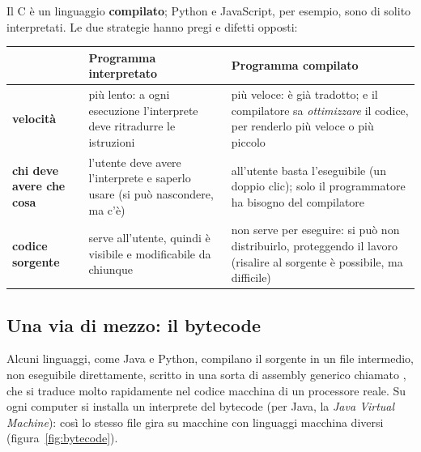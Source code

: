 Il C è un linguaggio \textbf{compilato}; Python e JavaScript, per esempio,
sono di solito interpretati. Le due strategie hanno pregi e difetti
opposti:

\begin{center}
\renewcommand{\arraystretch}{1.45}
\begin{tabular}{@{}>{\raggedright\arraybackslash}p{2.8cm}>{\raggedright\arraybackslash}p{6.6cm}>{\raggedright\arraybackslash}p{6.6cm}@{}}
  \toprule
  & \textbf{Programma interpretato} & \textbf{Programma compilato} \\
  \midrule
  \textbf{velocità} & più lento: a ogni esecuzione l'interprete deve ritradurre
    le istruzioni & più veloce: è già tradotto; e il compilatore sa
    \textit{ottimizzare} il codice, per renderlo più veloce o più piccolo \\
  \textbf{chi deve avere che cosa} & l'utente deve avere l'interprete e saperlo
    usare (si può nascondere, ma c'è) & all'utente basta l'eseguibile (un
    doppio clic); solo il programmatore ha bisogno del compilatore \\
  \textbf{codice sorgente} & serve all'utente, quindi è visibile e
    modificabile da chiunque & non serve per eseguire: si può non
    distribuirlo, proteggendo il lavoro (risalire al sorgente è possibile, ma
    difficile) \\
  \bottomrule
\end{tabular}
\end{center}

\subsection{Una via di mezzo: il bytecode}

Alcuni linguaggi, come Java e Python, compilano il sorgente in un file
intermedio, non eseguibile direttamente, scritto in una sorta di assembly
generico chiamato , che si traduce molto rapidamente nel
codice macchina di un processore reale. Su ogni computer si installa un
interprete del bytecode (per Java, la \textit{Java Virtual Machine}): così
lo stesso file gira su macchine con linguaggi macchina diversi
(figura~\ref{fig:bytecode}).

